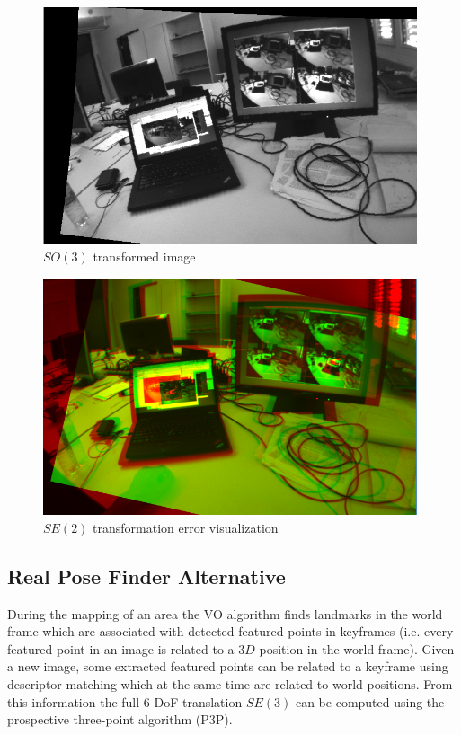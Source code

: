 \begin{figure}[htpb]
  \centering
  \includegraphics[width=11cm]{img/so3_transformation_1.png}
  \caption{$SO(3)$ transformed image}
  \label{fig:so3_transformation_1}
\end{figure}

\begin{figure}[htpb]
  \centering
  \includegraphics[width=11cm]{img/se2_error_1.png}
  \caption{$SE(2)$ transformation error visualization}
  \label{fig:se3_error_1}
\end{figure}


\subsection{Real Pose Finder Alternative}
\label{sub:real_pose_finder_alternative}

During the mapping of an area the VO algorithm finds landmarks in the world frame which are associated with detected featured points in keyframes (i.e. every featured point in an image is related to a $3D$ position in the world frame). Given a new image, some extracted featured points can be related to a keyframe using descriptor-matching which at the same time are related to world positions. From this information the full 6 DoF translation $SE(3)$ can be computed using the prospective three-point algorithm (P3P).\\

